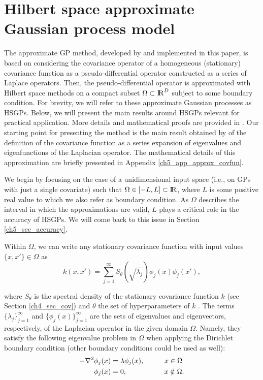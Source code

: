 \documentclass[onecolumn,a4paper,11pt]{article}
\begin{document}
\section{Hilbert space approximate Gaussian process model}\label{ch5_sec_method}

The approximate GP method, developed by \cite{solin2018hilbert} and implemented in this paper, is based on considering the covariance operator of a homogeneous (stationary) covariance function as a pseudo-differential operator constructed as a series of Laplace operators. Then, the pseudo-differential operator is approximated with Hilbert space methods on a compact subset $\Omega \subset {\rm I\!R}^D$ subject to some boundary condition. For brevity, we will refer to these approximate Gaussian processes as HSGPs. Below, we will present the main results around HSGPs relevant for practical application. More details and mathematical proofs are provided in \cite{solin2018hilbert}. Our starting point for presenting the method is the main result obtained by \cite{solin2018hilbert} of the definition of the covariance function as a series expansion of eigenvalues and eigenfunctions of the Laplacian operator. The mathematical details of this approximation are briefly presented in Appendix \ref{ch5_app_approx_covfun}.

We begin by focusing on the case of a unidimensional input space (i.e., on GPs with just a single covariate) such that $\Omega \in [-L,L] \subset {\rm I\!R}$, where $L$ is some positive real value to which we also refer as boundary condition. As $\Omega$ describes the interval in which the approximations are valid, $L$ plays a critical role in the accuracy of HSGPs. We will come back to this issue in Section \ref{ch5_sec_accuracy}.

Within $\Omega$, we can write any stationary covariance function with input values $\{x,x'\} \in \Omega$ as
%
\begin{equation}\label{eq_approxcov}
k(x,x') = \sum_{j=1}^\infty S_{\theta}(\sqrt{\lambda_j}) \phi_j(x) \phi_j(x'),
\end{equation} 

\noindent where $S_{\theta}$ is the spectral density of the stationary covariance function $k$ (see Section \ref{ch4_sec_cov}) and $\theta$ the set of hyperparameters of $k$ \citep{rasmussen2006gaussian}. The terms $\{\lambda_j\}_{j=1}^{\infty}$ and $\{\phi_j(x)\}_{j=1}^{\infty}$ are the sets of eigenvalues and eigenvectors, respectively, of the Laplacian operator in the given domain $\Omega$. Namely, they satisfy the following eigenvalue problem in $\Omega$ when applying the Dirichlet boundary condition (other boundary conditions could be used as well):
%
\begin{align}\label{eq_eigenproblem}
\begin{split}
-\nabla^2 \phi_j(x)&=\lambda \phi_j(x), \hspace{1cm}  x \in \Omega \\ 
\phi_j(x)&= 0, \hspace{1.85cm}   x \notin \Omega.
\end{split}
\end{align} 
\end{document}
